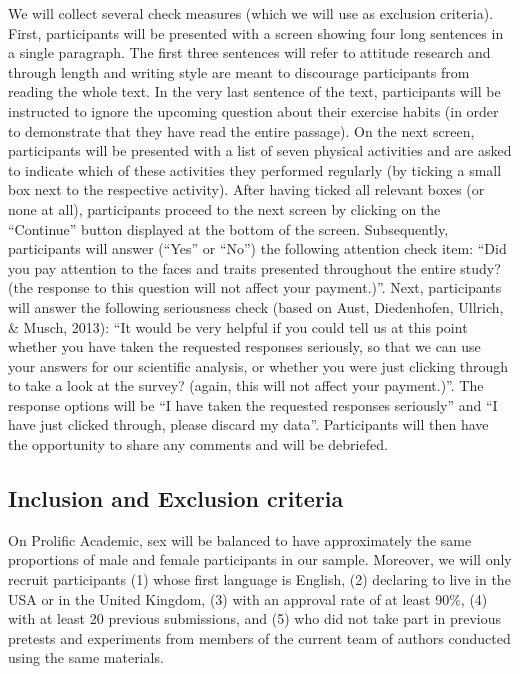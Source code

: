 \documentclass[
  doc,floatsintext]{apa6}
\begin{document}
We will collect several check measures (which we will use as exclusion criteria).
First, participants will be presented with a screen showing four long sentences in a single paragraph.
The first three sentences will refer to attitude research and through length and writing style are meant to discourage participants from reading the whole text.
In the very last sentence of the text, participants will be instructed to ignore the upcoming question about their exercise habits (in order to demonstrate that they have read the entire passage).
On the next screen, participants will be presented with a list of seven physical activities and are asked to indicate which of these activities they performed regularly (by ticking a small box next to the respective activity).
After having ticked all relevant boxes (or none at all), participants proceed to the next screen by clicking on the ``Continue'' button displayed at the bottom of the screen.
Subsequently, participants will answer (``Yes'' or ``No'') the following attention check item: ``Did you pay attention to the faces and traits presented throughout the entire study? (the response to this question will not affect your payment.)''.
Next, participants will answer the following seriousness check (based on Aust, Diedenhofen, Ullrich, \& Musch, 2013): ``It would be very helpful if you could tell us at this point whether you have taken the requested responses seriously, so that we can use your answers for our scientific analysis, or whether you were just clicking through to take a look at the survey? (again, this will not affect your payment.)''.
The response options will be ``I have taken the requested responses seriously'' and ``I have just clicked through, please discard my data''.
Participants will then have the opportunity to share any comments and will be debriefed.

\hypertarget{inclusion-and-exclusion-criteria}{%
\subsection{Inclusion and Exclusion criteria}\label{inclusion-and-exclusion-criteria}}

On Prolific Academic, sex will be balanced to have approximately the same proportions of male and female participants in our sample.
Moreover, we will only recruit participants (1) whose first language is English, (2) declaring to live in the USA or in the United Kingdom, (3) with an approval rate of at least 90\%, (4) with at least 20 previous submissions, and (5) who did not take part in previous pretests and experiments from members of the current team of authors conducted using the same materials.
\end{document}
